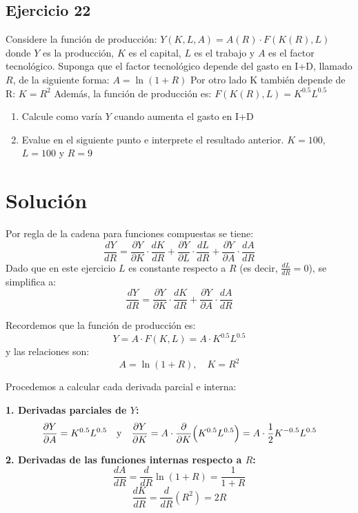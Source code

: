 \documentclass{article}
\begin{document}
\subsection{Ejercicio 22}
Considere la función de producción: $Y(K,L,A) = A(R) \cdot F(K(R),L)$
donde \(Y\) es la producción, \(K\) es el capital, \(L\) es el trabajo y \(A\) es el factor tecnológico. Suponga que el factor tecnológico depende del gasto en I+D, llamado \(R\), de la siguiente forma: $A = \ln(1+R)$
Por otro lado K también depende de R: $K=R^2$
Además, la función de producción es: $F(K(R),L) = K^{0.5}L^{0.5}$
\begin{enumerate}
    \item Calcule como varía $Y$ cuando aumenta el gasto en I+D 
    \item Evalue en el siguiente punto e interprete el resultado anterior. \(K = 100\), \(L = 100\) y \(R = 9\)
\end{enumerate}
\newpage
\section*{Solución}

Por regla de la cadena para funciones compuestas se tiene:
\begin{equation*}
\frac{dY}{dR} = \frac{\partial Y}{\partial K}\cdot \frac{dK}{dR} + \frac{\partial Y}{\partial L}\cdot \frac{dL}{dR} + \frac{\partial Y}{\partial A}\cdot \frac{dA}{dR}
\end{equation*}
Dado que en este ejercicio \(L\) es constante respecto a \(R\) (es decir, \(\frac{dL}{dR}=0\)), se simplifica a:
\begin{equation*}
\frac{dY}{dR} = \frac{\partial Y}{\partial K}\cdot \frac{dK}{dR} + \frac{\partial Y}{\partial A}\cdot \frac{dA}{dR}
\end{equation*}

Recordemos que la función de producción es:
\[
Y = A \cdot F(K,L) = A\cdot K^{0.5}L^{0.5}
\]
y las relaciones son:
\[
A = \ln(1+R),\quad K = R^2
\]

Procedemos a calcular cada derivada parcial e interna:

\textbf{1. Derivadas parciales de \(Y\):}
\[
\frac{\partial Y}{\partial A} = K^{0.5}L^{0.5}\quad \text{y} \quad
\frac{\partial Y}{\partial K} = A\cdot \frac{\partial}{\partial K}\Bigl(K^{0.5}L^{0.5}\Bigr) 
= A\cdot \frac{1}{2}K^{-0.5}L^{0.5}
\]

\textbf{2. Derivadas de las funciones internas respecto a \(R\):}
\[
\frac{dA}{dR} = \frac{d}{dR}\ln(1+R) = \frac{1}{1+R}
\]
\[
\frac{dK}{dR} = \frac{d}{dR}(R^2) = 2R
\]
\end{document}

